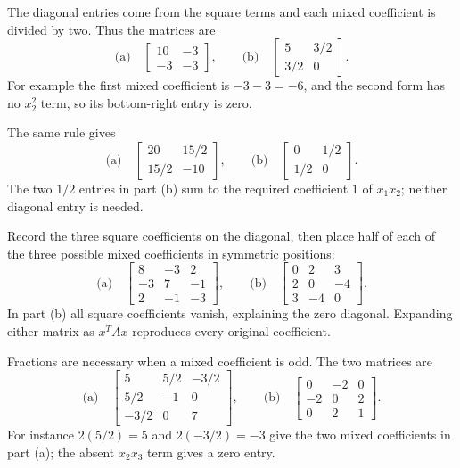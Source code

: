 The diagonal entries come from the square terms and each mixed coefficient
is divided by two. Thus the matrices are
\[
 \text{(a)}\quad\boxed{\begin{bmatrix}10&-3\\-3&-3\end{bmatrix}},
 \qquad\text{(b)}\quad\boxed{\begin{bmatrix}5&3/2\\3/2&0\end{bmatrix}}.
\]
For example the first mixed coefficient is $-3-3=-6$, and the second
form has no $x_2^2$ term, so its bottom-right entry is zero.

The same rule gives
\[
 \text{(a)}\quad\boxed{\begin{bmatrix}20&15/2\\15/2&-10\end{bmatrix}},
 \qquad\text{(b)}\quad\boxed{\begin{bmatrix}0&1/2\\1/2&0\end{bmatrix}}.
\]
The two $1/2$ entries in part (b) sum to the required coefficient $1$
of $x_1x_2$; neither diagonal entry is needed.

Record the three square coefficients on the diagonal, then place half of
each of the three possible mixed coefficients in symmetric positions:
\[
 \text{(a)}\quad\boxed{\begin{bmatrix}8&-3&2\\-3&7&-1\\2&-1&-3\end{bmatrix}},
 \qquad\text{(b)}\quad\boxed{\begin{bmatrix}0&2&3\\2&0&-4\\3&-4&0\end{bmatrix}}.
\]
In part (b) all square coefficients vanish, explaining the zero diagonal.
Expanding either matrix as $x^TAx$ reproduces every original coefficient.

Fractions are necessary when a mixed coefficient is odd. The two matrices are
\[
 \text{(a)}\quad\boxed{\begin{bmatrix}5&5/2&-3/2\\5/2&-1&0\\-3/2&0&7\end{bmatrix}},
 \qquad\text{(b)}\quad\boxed{\begin{bmatrix}0&-2&0\\-2&0&2\\0&2&1\end{bmatrix}}.
\]
For instance $2(5/2)=5$ and $2(-3/2)=-3$ give the two mixed
coefficients in part (a); the absent $x_2x_3$ term gives a zero entry.

